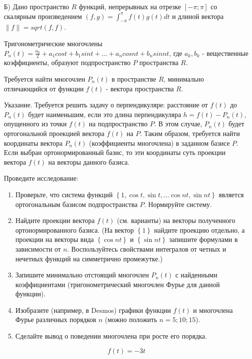 Б) Дано пространство $R$ функций, непрерывных на отрезке $[-\pi; \pi]$ со скалярным произведением $(f, g) = \int^\pi_{-\pi} f(t)g(t)dt$ и длиной вектора $\|f\| = sqrt{(f, f)}$.

Тригонометрические многочлены $P_n(t) = \frac{a_0}{2} + a_1 cost + b_1 sin t + \dots + a_n cos nt + b_n sin nt$, где $a_k, b_k$ - вещественные коэффициенты,
образуют подпространство $P$ пространства $R$.

Требуется найти многочлен $P_n(t)$ в пространстве $R$, минимально отличающийся от функции $f(t)$ - вектора пространства $R$.

Указание.
Требуется решить задачу о перпендикуляре: расстояние от $f\left(t\right)$ до $P_n\left(t\right)$ будет наименьшим,
если это длина перпендикуляра $h=f\left(t\right)-P_n\left(t\right)$, опущенного из точки $f\left(t\right)$ на подпространство $P$.
В этом случае, $P_n\left(t\right)$ будет ортогональной проекцией вектора $f\left(t\right)$ на $P$.
Таким образом, требуется найти координаты вектора $P_n\left(t\right)$ (коэффициенты многочлена) в заданном базисе $P$.
Если выбран ортонормированный базис, то эти координаты суть проекции вектора $f\left(t\right)$ на векторы данного базиса.

Проведите исследование:
\begin{enumerate}
	\item Проверьте, что система функций $\left\{1,\cos{t},\sin{t},\ldots\cos{n}t,\sin{n}t\right\}$ является ортогональным базисом подпространства $P$. Нормируйте систему.
	\item Найдите проекции вектора $f\left(t\right)$ (см. варианты) на векторы полученного ортонормированного базиса.
(На вектор $\left\{1\right\}$ найдите проекцию отдельно, а проекции на векторы вида $\left\{\cos{n}t\right\}$ и $\left\{\sin{n}t\right\}$ запишите формулами в зависимости от $n$. Воспользуйтесь свойствами интегралов от четных и нечетных функций на симметрично промежутке.)
	\item Запишите минимально отстоящий многочлен $P_n\left(t\right)$ с найденными коэффициентами (тригонометрический многочлен Фурье для данной функции).
	\item Изобразите (например, в Desmos) графики функции $f\left(t\right)$ и многочлена Фурье различных порядков $n$ (можно положить $n=5;10;15$).
	\item Сделайте вывод о поведении многочлена при росте его порядка.
\end{enumerate}

\[f\left(t\right)=-3t\]

